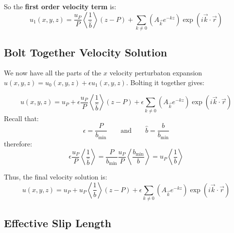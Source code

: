 \documentclass[12pt, a4paper, twoside, openright]{book}
\newcommand{\bmin}{\ensuremath{b_{\mathrm{min}}}}
\begin{document}
\vspace{1em}
So the \textbf{first order velocity term} is:
\begin{equation}
u_1(x,y,z) =  \frac{u_P}{P} \left< \frac{1}{\hat{b}} \right> (z - P)
 + \sum_{k \neq 0} 
\left(  A_{\vec{k}} e^{-kz} \right)
\exp(i \vec{k}\cdot \vec{r})
\end{equation}


\subsection{Bolt Together Velocity Solution}
We now have all the parts of the $x$ velocity perturbaton expansion $u(x,y,z) = u_0(x,y,z) + \epsilon u_1(x,y,z)$.  Bolting it together gives:

\begin{equation}
u(x,y,z) = u_P
 + \epsilon \frac{u_P}{P} \left< \frac{1}{\hat{b}} \right> (z - P)
 +  \epsilon \sum_{k \neq 0} 
\left(  A_{\vec{k}} e^{-kz} \right)
\exp(i \vec{k}\cdot \vec{r})
\end{equation}
Recall that:
\begin{equation}
\epsilon = \frac{P}{\bmin} \qquad \text{and} \qquad
\hat{b} = \frac{b}{\bmin}
\end{equation}
therefore:
\begin{equation}
\epsilon \frac{u_P}{P} \left< \frac{1}{\hat{b}} \right> 
= \frac{P}{\bmin} \frac{u_P}{P} \left< \frac{\bmin}{b} \right> 
= u_P \left< \frac{1}{b} \right>
\end{equation}

Thus, the final velocity solution is:
\begin{equation}
u(x,y,z) = u_P
 + u_P\left< \frac{1}{b} \right> (z - P)
 +  \epsilon \sum_{k \neq 0} 
\left(  A_{\vec{k}} e^{-kz} \right)
\exp(i \vec{k}\cdot \vec{r})
\end{equation}

\subsection{Effective Slip Length}
\end{document}

